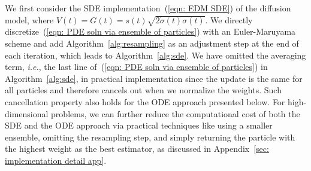 \documentclass{article}
\numberwithin{equation}{section}
\def\eqref#1{(\ref{#1})}
\begin{document}
We first consider the SDE implementation~\eqref{eqn: EDM SDE} of the diffusion model, where $V(t) = G(t) = s(t)\sqrt{2\dot{\sigma}(t)\sigma(t)}$. We directly discretize~\eqref{eqn: PDE soln via ensemble of particles} with an Euler-Maruyama scheme and add Algorithm~\ref{alg:resampling} as an adjustment step at the end of each iteration, which leads to Algorithm~\ref{alg:sde}. We have omitted the averaging term, \emph{i.e.}, the last line of~\eqref{eqn: PDE soln via ensemble of particles} in Algorithm~\ref{alg:sde}, in practical implementation since the update is the same for all particles and therefore cancels out when we normalize the weights. Such cancellation property also holds for the ODE approach presented below. For high-dimensional problems, we can further reduce the computational cost of both the SDE and the ODE approach via practical techniques like using a smaller ensemble, omitting the resampling step, and simply returning the particle with the highest weight as the best estimator, as discussed in Appendix~\ref{sec: implementation detail app}.  

\end{document}
